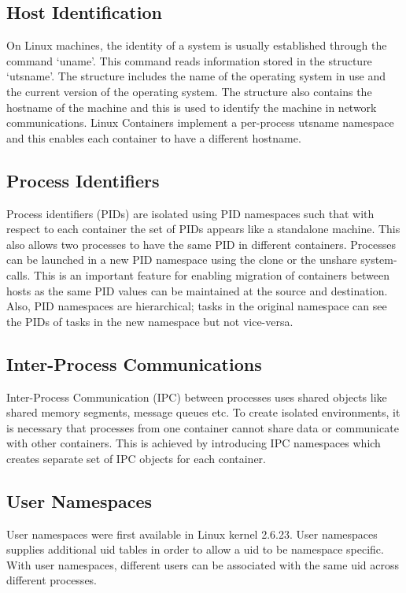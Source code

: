 \subsection{Host Identification}
On Linux machines, the identity of a system is usually established through the command `uname'. This command reads information stored in the structure `utsname'. The structure includes the name of the operating system in use and the current version of the operating system. The structure also contains the hostname of the machine and this is used to identify the machine in network communications. Linux Containers implement a per-process utsname namespace and this enables each container to have a different hostname.

\subsection{Process Identifiers}
Process identifiers (PIDs) are isolated using PID namespaces such that with respect to each container the set of PIDs appears like a standalone machine. This also allows two processes to  have the same PID in different containers. Processes can be launched in a new PID namespace using the clone or the unshare system-calls. This is an important feature for enabling migration of containers between hosts as the same PID values can be maintained at the source and destination. Also, PID namespaces are hierarchical; tasks in the original namespace can see the PIDs of tasks in the new namespace but not vice-versa.  

\subsection{Inter-Process Communications}
Inter-Process Communication (IPC) between processes uses shared objects like shared memory segments, message queues etc. To create isolated environments, it is necessary that processes from one container cannot share data or communicate with other containers. This is achieved by introducing IPC namespaces which creates separate set of IPC objects for each container.

\subsection{User Namespaces}
User namespaces were first available in Linux kernel 2.6.23.  User namespaces supplies additional uid tables in order to allow a uid to be namespace specific.  With user namespaces, different users can be associated with the same uid across different processes.

